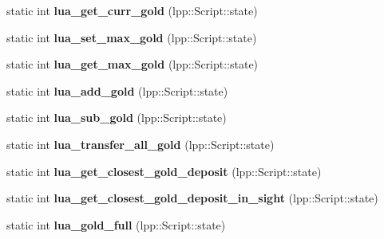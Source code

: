 \begin{DoxyCompactItemize}
\item 
static int {\bfseries lua\+\_\+get\+\_\+curr\+\_\+gold} (lpp\+::\+Script\+::state)\hypertarget{class_lua_interface_ad1122b461301f3fe65d449a3a58964ba}{}\label{class_lua_interface_ad1122b461301f3fe65d449a3a58964ba}

\item 
static int {\bfseries lua\+\_\+set\+\_\+max\+\_\+gold} (lpp\+::\+Script\+::state)\hypertarget{class_lua_interface_a72ab2d36291af1722cfa0db36133065b}{}\label{class_lua_interface_a72ab2d36291af1722cfa0db36133065b}

\item 
static int {\bfseries lua\+\_\+get\+\_\+max\+\_\+gold} (lpp\+::\+Script\+::state)\hypertarget{class_lua_interface_ade6342959e71c1f4a47f66283b2cf309}{}\label{class_lua_interface_ade6342959e71c1f4a47f66283b2cf309}

\item 
static int {\bfseries lua\+\_\+add\+\_\+gold} (lpp\+::\+Script\+::state)\hypertarget{class_lua_interface_a5b47fff914ee6df76bdfe5c761f47de2}{}\label{class_lua_interface_a5b47fff914ee6df76bdfe5c761f47de2}

\item 
static int {\bfseries lua\+\_\+sub\+\_\+gold} (lpp\+::\+Script\+::state)\hypertarget{class_lua_interface_a0c79eaab00009793eeb7bdad8f2fab9e}{}\label{class_lua_interface_a0c79eaab00009793eeb7bdad8f2fab9e}

\item 
static int {\bfseries lua\+\_\+transfer\+\_\+all\+\_\+gold} (lpp\+::\+Script\+::state)\hypertarget{class_lua_interface_a7c7bf6dc34f43c456c291e5cedd3ec81}{}\label{class_lua_interface_a7c7bf6dc34f43c456c291e5cedd3ec81}

\item 
static int {\bfseries lua\+\_\+get\+\_\+closest\+\_\+gold\+\_\+deposit} (lpp\+::\+Script\+::state)\hypertarget{class_lua_interface_a12a37c2d362101031bc60734c2a63a46}{}\label{class_lua_interface_a12a37c2d362101031bc60734c2a63a46}

\item 
static int {\bfseries lua\+\_\+get\+\_\+closest\+\_\+gold\+\_\+deposit\+\_\+in\+\_\+sight} (lpp\+::\+Script\+::state)\hypertarget{class_lua_interface_a97269a536e7f1bccc006afbed3abfb1f}{}\label{class_lua_interface_a97269a536e7f1bccc006afbed3abfb1f}

\item 
static int {\bfseries lua\+\_\+gold\+\_\+full} (lpp\+::\+Script\+::state)\hypertarget{class_lua_interface_af9f077ba6f9ca36d22ccc7f18500b23c}{}\label{class_lua_interface_af9f077ba6f9ca36d22ccc7f18500b23c}


\end{DoxyCompactItemize}
